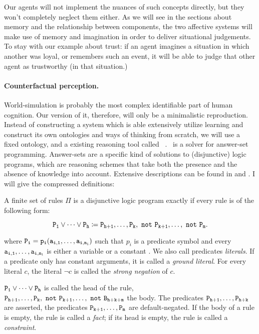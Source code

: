 Our agents will not implement the nuances of such concepts directly, but they won't completely neglect them either. As we will see in the sections about memory and the relationship between components, the two affective systems will make use of memory and imagination in order to deliver situational judgements. To stay with our example about trust: if an agent imagines a situation in which another was loyal, or remembers such an event, it will be able to judge that other agent as trustworthy (in that situation.)

\paragraph{Counterfactual perception.} World-simulation is probably the most complex identifiable part of human cognition. Our version of it, therefore, will only be a minimalistic reproduction. Instead of constructing a system which is able extensively utilize learning and construct its own ontologies and ways of thinking from scratch, we will use a fixed ontology, and a existing reasoning tool called \dlvhex\ \cite{dlvhex}. \dlvhex\ is a solver for answer-set programming. Answer-sets are a specific kind of solutions to (disjunctive) logic programs, which are reasoning schemes that take both the presence and the absence of knowledge into account. Extensive descriptions can be found in \cite{lifschitz2008} and \cite{baral2003}. I will give the compressed definitions:

\begin{definition}
	A finite set of rules $\Pi$ is a disjunctive logic program exactly if every rule is of the following form:
	
	$$
		\field{P_1 \vee \dots \vee P_h} \aspR \field{P_{h+1}, \dots, P_{k},\ not\ P_{k+1}, \dots,\ not\ P_{m}}.
	$$
	
	where $\mathtt{P_i = p_i(a_{i,1},\dots,a_{i,n_i})}$ such that $p_i$ is a predicate symbol and every $\mathtt{a_{i,1},\dots,a_{i,n_i}}$ is either a variable or a constant . We also call predicates {\em literals}. If a predicate only has constant arguments, it is called a {\em ground literal}. For every literal $c$, the literal $\neg c$ is called the {\em strong negation} of $c$.
	
	$\mathtt{P_1 \vee \dots \vee P_h}$ is called the head of the rule, $\mathtt{P_{h+1}, \dots, P_{k},\ not\ P_{k+1}, \dots,\ not\ B_{h+k+m}}$ the body. The predicates $\mathtt{P_{h+1}, \dots, P_{h+k}}$ are asserted, the predicates $\mathtt{P_{k+1}, \dots, P_{m}}$ are default-negated. If the body of a rule is empty, the rule is called a {\em fact}; if its head is empty, the rule is called a {\em constraint}.
\end{definition}

